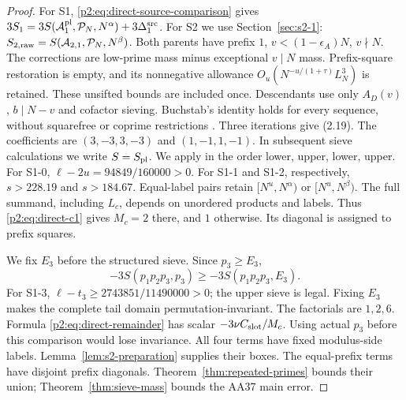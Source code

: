 \begin{proof}
For S1, \eqref{p2:eq:direct-source-comparison} gives
$3S_1=3S(\mathcal A_1^{\rm pl},\mathcal P_N,N^\alpha)+3\Delta_1^{\rm src}$.
For S2 we use Section~\ref{sec:s2-1}:
$S_{2,\rm raw}=S(\mathcal A_{2,1},\mathcal P_N,N^\beta)$.
Both parents have prefix $1$, $v<(1-\epsilon_A)N$, $v\nmid N$.
The corrections are low-prime mass minus exceptional $v\mid N$ mass.
Prefix-square restoration is empty, and its nonnegative allowance $O_u(N^{-u/(1+\tau)}L_N^3)$ is retained.
These unsifted bounds are included once.
Descendants use only $A_D(v)$, $b\mid N-v$ and cofactor sieving.
Buchstab's identity holds for every sequence, without squarefree or coprime
restrictions \cite{Buchstab1937}.
Three iterations give (2.19).
The coefficients are $(3,-3,3,-3)$ and $(1,-1,1,-1)$.
In subsequent sieve calculations we write $S=S_{\rm pl}$.
We apply \cite[Theorem~4]{ref5} in the order lower, upper, lower, upper.
For S1-0, $\ell-2u=94849/160000>0$.
For S1-1 and S1-2, respectively, $s>228.19$ and $s>184.67$.
Equal-label pairs retain $[N^u,N^\alpha)$ or $[N^u,N^\beta)$.
The full summand, including $L_c$, depends on unordered products and labels.
Thus \eqref{p2:eq:direct-c1} gives $M_c=2$ there, and $1$ otherwise.
Its diagonal is assigned to prefix squares.

We fix $E_3$ before the structured sieve.
Since $p_3\ge E_3$,
\[
 -3S(p_1p_2p_3,p_3)\ge-3S(p_1p_2p_3,E_3).
 \tag{2.20}\label{p2:eq:2.20}
\]
For S1-3, $\ell-t_3\ge2743851/11490000>0$; the upper sieve is legal.
Fixing $E_3$ makes the complete tail domain permutation-invariant.
The factorials are $1,2,6$.
Formula \eqref{p2:eq:direct-remainder} has scalar $-3\nu C_{\rm slot}/M_c$.
Using actual $p_3$ before this comparison would lose invariance.
All four terms have fixed modulus-side labels.
Lemma~\ref{lem:s2-preparation} supplies their boxes.
The equal-prefix terms have disjoint prefix diagonals.
Theorem~\ref{thm:repeated-primes} bounds their union;
Theorem~\ref{thm:sieve-mass} bounds the AA37 main error.


\end{proof}
